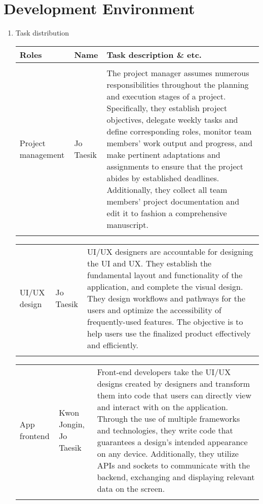 \section{\Large{Development Environment}}
\begin{enumerate}[label=\arabic*]
    \item {\large{Task distribution}}
    \begin{table}[H]
    \center
    \begin{tabular}{m{1.4cm} m{1.5cm} m{4cm}}
    \toprule
    Roles & Name & Task description \& etc.\\
    \midrule
    \\
    Project management & Jo Taesik & The project manager assumes numerous responsibilities throughout the planning and execution stages of a project. Specifically, they establish project objectives, delegate weekly tasks and define corresponding roles, monitor team members' work output and progress, and make pertinent adaptations and assignments to ensure that the project abides by established deadlines. Additionally, they collect all team members' project documentation and edit it to fashion a comprehensive manuscript. \\\\
    \bottomrule
    \end{tabular}
    \end{table}
    
    \begin{table}[H]
    \center
    \begin{tabular}{m{1.4cm} m{1.5cm} m{4cm}}
    UI/UX design & Jo Taesik & UI/UX designers are accountable for designing the UI and UX. They establish the fundamental layout and functionality of the application, and complete the visual design. They design workflows and pathways for the users and optimize the accessibility of frequently-used features. The objective is to help users use the finalized product effectively and efficiently. \\\\
    \bottomrule
    \end{tabular}
    \end{table}

    \begin{table}[H]
    \center
    \begin{tabular}{m{1.4cm} m{1.5cm} m{4cm}}
    App frontend & Kwon Jongin, Jo Taesik & Front-end developers take the UI/UX designs created by designers and transform them into code that users can directly view and interact with on the application. Through the use of multiple frameworks and technologies, they write code that guarantees a design’s intended appearance on any device. Additionally, they utilize APIs and sockets to communicate with the backend, exchanging and displaying relevant data on the screen. \\\\
    \bottomrule
    \end{tabular}
    \end{table}


\end{enumerate}
